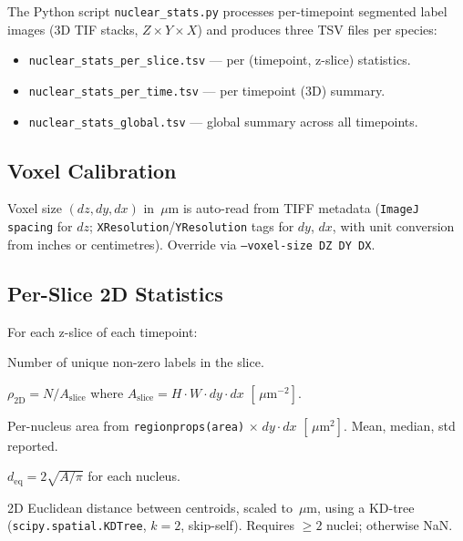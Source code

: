 \documentclass[11pt,a4paper]{article}
\newcommand{\um}{\,\mu\text{m}}
\begin{document}
The Python script \texttt{nuclear\_stats.py} processes per-timepoint
segmented label images (3D TIF stacks, $Z \times Y \times X$) and produces
three TSV files per species:

\begin{itemize}[nosep]
  \item \texttt{nuclear\_stats\_per\_slice.tsv} --- per (timepoint, z-slice)
        statistics.
  \item \texttt{nuclear\_stats\_per\_time.tsv} --- per timepoint (3D) summary.
  \item \texttt{nuclear\_stats\_global.tsv} --- global summary across all
        timepoints.
\end{itemize}

\subsection*{Voxel Calibration}

Voxel size $(dz, dy, dx)$ in $\um$ is auto-read from TIFF metadata
(\texttt{ImageJ spacing} for $dz$; \texttt{XResolution}/\texttt{YResolution}
tags for $dy$, $dx$, with unit conversion from inches or centimetres).
Override via \texttt{--voxel-size DZ DY DX}.

\subsection*{Per-Slice 2D Statistics}

For each z-slice of each timepoint:

\begin{description}[style=nextline,leftmargin=2cm]
  \item[Nuclear count] Number of unique non-zero labels in the slice.
  \item[Density] $\rho_{2\text{D}} = N / A_\mathrm{slice}$ where
    $A_\mathrm{slice} = H \cdot W \cdot dy \cdot dx$ \;$[\um^{-2}]$.
  \item[Nuclear area] Per-nucleus area from \texttt{regionprops(area)}
    $\times\; dy \cdot dx$ \;$[\um^2]$.  Mean, median, std reported.
  \item[Equivalent-circle diameter]
    $d_\mathrm{eq} = 2\sqrt{A/\pi}$ for each nucleus.
  \item[Nearest-neighbor distance]  2D Euclidean distance between centroids,
    scaled to $\um$, using a KD-tree (\texttt{scipy.spatial.KDTree}, $k=2$,
    skip-self).  Requires $\ge 2$ nuclei; otherwise NaN.
\end{description}
\end{document}
